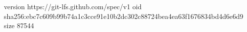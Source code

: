 version https://git-lfs.github.com/spec/v1
oid sha256:ebc7c609b99b74a1c3cce91e10b2dc302c88724bea4ea63f1676834bd4d6e6d9
size 87544

